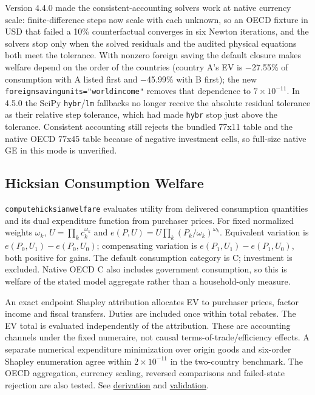 \documentclass[11pt,letterpaper]{article}
\renewcommand{\_}{\pmunderscore\allowbreak}
\begin{document}
Version 4.4.0 made the consistent-accounting solvers work at native currency
scale: finite-difference steps now scale with each unknown, so an OECD fixture
in USD that failed a 10\% counterfactual converges in six Newton iterations, and
the solvers stop only when the solved residuals and the audited physical
equations both meet the tolerance. With nonzero foreign saving the default
closure makes welfare depend on the order of the countries (country A's EV is
−27.55\% of consumption with A listed first and −45.99\% with B first); the new
\texttt{foreign\_saving\_units="world\_income"} removes that dependence to
\(7\times10^{-11}\). In 4.5.0 the SciPy \texttt{hybr}/\texttt{lm} fallbacks no longer receive the
absolute residual tolerance as their relative step tolerance, which had made
\texttt{hybr} stop just above the tolerance. Consistent accounting still rejects the
bundled 77x11 table and the native OECD 77x45 table because of negative
investment cells, so full-size native GE in this mode is unverified.

\subsection{Hicksian Consumption Welfare}\label{hicksian-consumption-welfare}

\texttt{compute\_hicksian\_welfare} evaluates utility from delivered consumption quantities
and its dual expenditure function from purchaser prices. For fixed normalized
weights \(\omega_k\), \(U=\prod_k c_k^{\omega_k}\) and
\(e(P,U)=U\prod_k(P_k/\omega_k)^{\omega_k}\). Equivalent variation is
\(e(P_0,U_1)-e(P_0,U_0)\); compensating variation is
\(e(P_1,U_1)-e(P_1,U_0)\), both positive for gains. The default consumption category
is C; investment is excluded. Native OECD C also includes government consumption,
so this is welfare of the stated model aggregate rather than a household-only measure.

An exact endpoint Shapley attribution allocates EV to purchaser prices, factor
income and fiscal transfers. Duties are included once within total rebates.
The EV total is evaluated independently of the attribution. These are accounting
channels under the fixed numeraire, not causal terms-of-trade/efficiency effects.
A separate numerical expenditure minimization over origin goods and six-order
Shapley enumeration agree within \(2\times10^{-11}\) in the two-country benchmark.
The OECD aggregation, currency scaling, reversed comparisons and failed-state
rejection are also tested. See \href{https://github.com/jalonso1979/puremacro/blob/v4.6.0/docs/trade_welfare.md}{derivation} and
\href{https://github.com/jalonso1979/puremacro/blob/v4.6.0/reviews/2026-09-20-hicksian-welfare/REPORT.md}{validation}.
\end{document}
